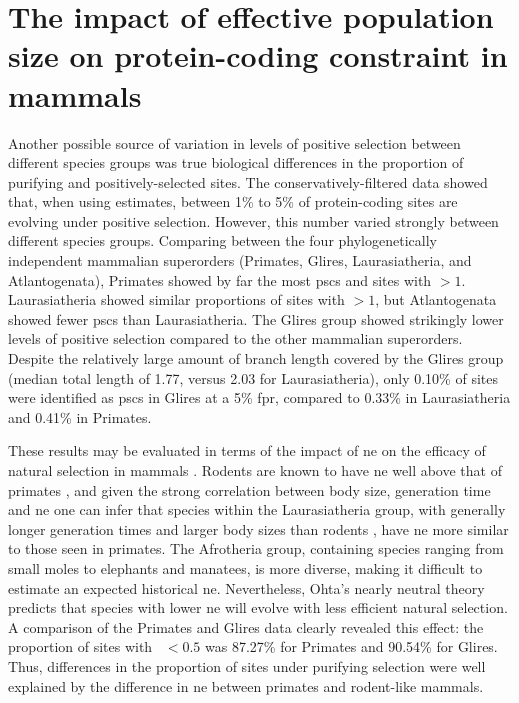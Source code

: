 \section{The impact of effective population size on protein-coding constraint in mammals}

Another possible source of variation in levels of positive selection
between different species groups was true biological differences in
the proportion of purifying and positively-selected sites. The
conservatively-filtered \sw data showed that, when using \omgml
estimates, between 1\% to 5\% of protein-coding sites are evolving
under positive selection. However, this number varied strongly between
different species groups. Comparing between the four phylogenetically
independent mammalian superorders (Primates, Glires, Laurasiatheria,
and Atlantogenata), Primates showed by far the most \acp{psc} and
sites with \omgml$>1$. Laurasiatheria showed similar proportions of
sites with \omgml$>1$, but Atlantogenata showed fewer \acp{psc} than
Laurasiatheria. The Glires group showed strikingly lower levels of
positive selection compared to the other mammalian
superorders. Despite the relatively large amount of branch length
covered by the Glires group (median total length of 1.77, versus 2.03
for Laurasiatheria), only 0.10\% of sites were identified as \acp{psc}
in Glires at a 5\% \ac{fpr}, compared to 0.33\% in Laurasiatheria and
0.41\% in Primates.

These results may be evaluated in terms of the impact of \ac{ne} on
the efficacy of natural selection in mammals
\citep{Popadin2007,Nikolaev2007,Ellegren2009}. Rodents are known to
have \ac{ne} well above that of primates \citep{Kosiol2008}, and given
the strong correlation between body size, generation time and \ac{ne}
\citep{Nikolaev2007} one can infer that species within the
Laurasiatheria group, with generally longer generation times and
larger body sizes than rodents \citep{Hou2009}, have \ac{ne} more
similar to those seen in primates. The Afrotheria group, containing
species ranging from small moles to elephants and manatees, is more
diverse, making it difficult to estimate an expected historical
\ac{ne}. Nevertheless, Ohta's nearly neutral theory \citep{Ohta1992}
predicts that species with lower \ac{ne} will evolve with less
efficient natural selection. A comparison of the Primates and Glires
data clearly revealed this effect: the proportion of sites with
\omgml~$<0.5$ was 87.27\% for Primates and 90.54\% for Glires. Thus,
differences in the proportion of sites under purifying selection were
well explained by the difference in \ac{ne} between primates and
rodent-like mammals.

